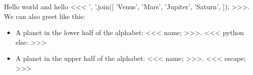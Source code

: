 \documentclass[a4paper]{report}
\begin{document}
    Hello world and hello <<<
        ', '.join([
            'Venus',
            'Mars',
            'Jupiter',
            'Saturn',
        ]);
    >>>. We can also greet like this:

    \begin{itemize}
        <<< python
        for name in [
            'Sun'
            'Mercury',
            'Venus',
            'Earth',
            'Mars',
            'Jupiter',
            'Saturn',
            'Uranus',
            'Neptune',
        ]:
            if re.match(r'^[a-m]', name, re.IGNORECASE):
        >>>
        \item A planet in the lower half of the alphabet: <<< name; >>>.
        <<< python
            else:
        >>>
        \item A planet in the upper half of the alphabet: <<< name; >>>.
        <<< escape; >>>
    \end{itemize}
\end{document}
